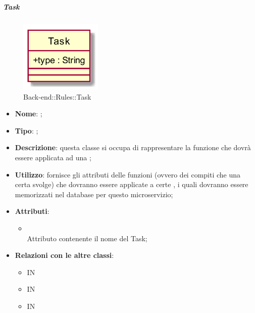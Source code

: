 \hypertarget{Task_label}{\subparagraph{Task}}
\begin{figure}[h]
	\centering
	\includegraphics[width=0.35\textwidth,height=\textheight,keepaspectratio]{images/ClassTask.png}
	\caption{Back-end::Rules::Task}
\end{figure}
\begin{itemize}
	\item \textbf{Nome}: ;
	\item \textbf{Tipo}: ;
	\item \textbf{Descrizione}: questa classe si occupa di rappresentare la funzione che dovrà essere applicata ad una ;
	\item \textbf{Utilizzo}: fornisce gli attributi delle funzioni (ovvero dei compiti che una certa  svolge) che dovranno essere applicate a certe , i quali dovranno essere memorizzati nel database per questo microservizio;
	\item \textbf{Attributi}:
	\begin{itemize}
		\item[]  \\
		Attributo contenente il nome del Task;
	\end{itemize}
	\item \textbf{Relazioni con le altre classi}:
	\begin{itemize}
		\item IN \hyperlink{TaskObserver_label}{}
		\item IN \hyperlink{TasksDAODynamoDB_label}{}
		\item IN \hyperlink{<<interface>> TasksDAO_label}{}
	\end{itemize}
\end{itemize}
\FloatBarrier

